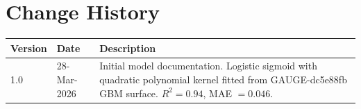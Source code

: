 \documentclass[11pt,a4paper]{article}
\begin{document}
\section{Change History}

\begin{center}
\begin{tabular}{llp{9cm}}
\toprule
\textbf{Version} & \textbf{Date} & \textbf{Description} \\
\midrule
1.0 & 28-Mar-2026 & Initial model documentation. Logistic sigmoid with
    quadratic polynomial kernel fitted from GAUGE-dc5e88fb GBM surface.
    $R^2 = 0.94$, MAE $= 0.046$. \\
\bottomrule
\end{tabular}
\end{center}
\end{document}
